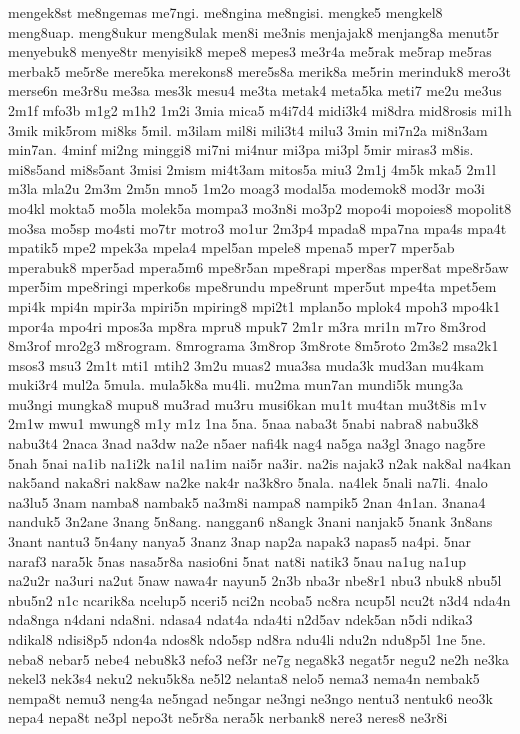 {mengek8st me8ngemas me7ngi. me8ngina me8ngisi. mengke5 mengkel8 meng8uap.
meng8ukur meng8ulak men8i me3nis menjajak8 menjang8a menut5r menyebuk8
menye8tr menyisik8 mepe8 mepes3 me3r4a me5rak me5rap me5ras merbak5 me5r8e
mere5ka merekons8 mere5s8a merik8a me5rin merinduk8 mero3t merse6n me3r8u
me3sa mes3k mesu4 me3ta metak4 meta5ka meti7 me2u me3us 2m1f mfo3b m1g2
m1h2 1m2i 3mia mica5 m4i7d4 midi3k4 mi8dra mid8rosis mi1h 3mik mik5rom
mi8ks 5mil. m3ilam mil8i mili3t4 milu3 3min mi7n2a mi8n3am min7an. 4minf
mi2ng minggi8 mi7ni mi4nur mi3pa mi3pl 5mir miras3 m8is. mi8s5and mi8s5ant
3misi 2mism mi4t3am mitos5a miu3 2m1j 4m5k mka5 2m1l m3la mla2u 2m3m 2m5n
mno5 1m2o moag3 modal5a modemok8 mod3r mo3i mo4kl mokta5 mo5la molek5a
mompa3 mo3n8i mo3p2 mopo4i mopoies8 mopolit8 mo3sa mo5sp mo4sti mo7tr
motro3 mo1ur 2m3p4 mpada8 mpa7na mpa4s mpa4t mpatik5 mpe2 mpek3a mpela4
mpel5an mpele8 mpena5 mper7 mper5ab mperabuk8 mper5ad mpera5m6 mpe8r5an
mpe8rapi mper8as mper8at mpe8r5aw mper5im mpe8ringi mperko6s mpe8rundu
mpe8runt mper5ut mpe4ta mpet5em mpi4k mpi4n mpir3a mpiri5n mpiring8 mpi2t1
mplan5o mplok4 mpoh3 mpo4k1 mpor4a mpo4ri mpos3a mp8ra mpru8 mpuk7 2m1r
m3ra mri1n m7ro 8m3rod 8m3rof mro2g3 m8rogram. 8mrograma 3m8rop 3m8rote
8m5roto 2m3s2 msa2k1 msos3 msu3 2m1t mti1 mtih2 3m2u muas2 mua3sa muda3k
mud3an mu4kam muki3r4 mul2a 5mula. mula5k8a mu4li. mu2ma mun7an mundi5k
mung3a mu3ngi mungka8 mupu8 mu3rad mu3ru musi6kan mu1t mu4tan mu3t8is m1v
2m1w mwu1 mwung8 m1y m1z 1na 5na. 5naa naba3t 5nabi nabra8 nabu3k8 nabu3t4
2naca 3nad na3dw na2e n5aer nafi4k nag4 na5ga na3gl 3nago nag5re 5nah 5nai
na1ib na1i2k na1il na1im nai5r na3ir. na2is najak3 n2ak nak8al na4kan
nak5and naka8ri nak8aw na2ke nak4r na3k8ro 5nala. na4lek 5nali na7li.
4nalo na3lu5 3nam namba8 nambak5 na3m8i nampa8 nampik5 2nan 4n1an. 3nana4
nanduk5 3n2ane 3nang 5n8ang. nanggan6 n8angk 3nani nanjak5 5nank 3n8ans
3nant nantu3 5n4any nanya5 3nanz 3nap nap2a napak3 napas5 na4pi. 5nar
naraf3 nara5k 5nas nasa5r8a nasio6ni 5nat nat8i natik3 5nau na1ug na1up
na2u2r na3uri na2ut 5naw nawa4r nayun5 2n3b nba3r nbe8r1 nbu3 nbuk8 nbu5l
nbu5n2 n1c ncarik8a ncelup5 nceri5 nci2n ncoba5 nc8ra ncup5l ncu2t n3d4
nda4n nda8nga n4dani nda8ni. ndasa4 ndat4a nda4ti n2d5av ndek5an n5di
ndika3 ndikal8 ndisi8p5 ndon4a ndos8k ndo5sp nd8ra ndu4li ndu2n ndu8p5l
1ne 5ne. neba8 nebar5 nebe4 nebu8k3 nefo3 nef3r ne7g nega8k3 negat5r negu2
ne2h ne3ka nekel3 nek3s4 neku2 neku5k8a ne5l2 nelanta8 nelo5 nema3 nema4n
nembak5 nempa8t nemu3 neng4a ne5ngad ne5ngar ne3ngi ne3ngo nentu3 nentuk6
neo3k nepa4 nepa8t ne3pl nepo3t ne5r8a nera5k nerbank8 nere3 neres8 ne3r8i
}
